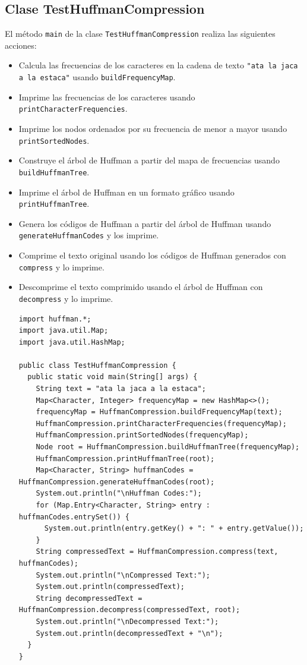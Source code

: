 \documentclass[10pt, a4paper]{article}
\newcommand{\mj}[1]{\texttt{#1}}
\begin{document}
\subsection{Clase TestHuffmanCompression}
  El método \mj{main} de la clase \mj{TestHuffmanCompression} realiza las siguientes acciones:
\begin{itemize}
  \item Calcula las frecuencias de los caracteres en la cadena de texto \mj{"ata la jaca a la estaca"} usando \mj{buildFrequencyMap}.
  \item Imprime las frecuencias de los caracteres usando \mj{printCharacterFrequencies}.
  \item Imprime los nodos ordenados por su frecuencia de menor a mayor usando \mj{printSortedNodes}.
  \item Construye el árbol de Huffman a partir del mapa de frecuencias usando \mj{buildHuffmanTree}.
  \item Imprime el árbol de Huffman en un formato gráfico usando \mj{printHuffmanTree}.
  \item Genera los códigos de Huffman a partir del árbol de Huffman usando \mj{generateHuffmanCodes} y los imprime.
  \item Comprime el texto original usando los códigos de Huffman generados con \mj{compress} y lo imprime.
  \item Descomprime el texto comprimido usando el árbol de Huffman con \mj{decompress} y lo imprime.
  \begin{verbatim}
import huffman.*;
import java.util.Map;
import java.util.HashMap;

public class TestHuffmanCompression {
  public static void main(String[] args) {
    String text = "ata la jaca a la estaca";
    Map<Character, Integer> frequencyMap = new HashMap<>();
    frequencyMap = HuffmanCompression.buildFrequencyMap(text);
    HuffmanCompression.printCharacterFrequencies(frequencyMap);
    HuffmanCompression.printSortedNodes(frequencyMap);
    Node root = HuffmanCompression.buildHuffmanTree(frequencyMap);
    HuffmanCompression.printHuffmanTree(root);
    Map<Character, String> huffmanCodes = HuffmanCompression.generateHuffmanCodes(root);
    System.out.println("\nHuffman Codes:");
    for (Map.Entry<Character, String> entry : huffmanCodes.entrySet()) {
      System.out.println(entry.getKey() + ": " + entry.getValue());
    }
    String compressedText = HuffmanCompression.compress(text, huffmanCodes);
    System.out.println("\nCompressed Text:");
    System.out.println(compressedText);
    String decompressedText = HuffmanCompression.decompress(compressedText, root);
    System.out.println("\nDecompressed Text:");
    System.out.println(decompressedText + "\n");
  }
}
  \end{verbatim}
\end{itemize}
\end{document}
